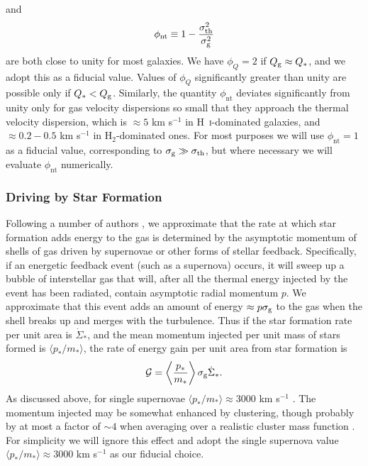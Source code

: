 \documentclass[useAMS,usenatbib]{mn2e}
\newcommand{\calG}{\mathcal{G}}
\newcommand{\phint}{\phi_{\mathrm{nt}}}
\begin{document}
and
\begin{equation}
\label{eq:phith}
\phi_{\rm nt} \equiv 1 - \frac{\sigma_{\rm th}^2}{\sigma_{\rm g}^2}
\end{equation}
are both close to unity for most galaxies. We have $\phi_Q = 2$ if $Q_{\rm g} \approx Q_*$, and we adopt this as a fiducial value. Values of $\phi_Q$ significantly greater than unity are possible only if $Q_* < Q_{\rm g}$. Similarly, the quantity $\phint$ deviates significantly from unity only for gas velocity dispersions so small that they approach the thermal velocity dispersion, which is $\approx 5$ km s$^{-1}$ in H~\textsc{i}-dominated galaxies, and $\approx 0.2 - 0.5$ km s$^{-1}$ in H$_2$-dominated ones. For most purposes we will use $\phint = 1$ as a fiducial value, corresponding to $\sigma_{\rm g} \gg \sigma_{\rm th}$, but where necessary we will evaluate $\phint$ numerically.


\subsubsection{Driving by Star Formation}
\label{sssec:driving}

Following a number of authors \citep{matzner02a, krumholz06d, krumholz17a, goldbaum11a, faucher-giguere13a}, we approximate that the rate at which star formation adds energy to the gas is determined by the asymptotic momentum of shells of gas driven by supernovae or other forms of stellar feedback. Specifically, if an energetic feedback event (such as a supernova) occurs, it will sweep up a bubble of interstellar gas that will, after all the thermal energy injected by the event has been radiated, contain  asymptotic radial momentum $p$. We approximate that this event adds an amount of energy $\approx p \sigma_{\rm g}$ to the gas when the shell breaks up and merges with the turbulence. Thus if the star formation rate per unit area is $\dot{\Sigma}_*$, and the mean momentum injected per unit mass of stars formed is $\langle p_*/m_*\rangle$, the rate of energy gain per unit area from star formation is
\begin{equation}
\calG = \left\langle\frac{p_*}{m_*}\right\rangle \sigma_{\rm g} \dot{\Sigma}_*.
\end{equation}
As discussed above, for single supernovae $\langle p_*/m_*\rangle \approx 3000$ km s$^{-1}$ \citep{cioffi88a, thornton98a, martizzi15a, kim15a, walch15b}. The momentum injected may be somewhat enhanced by clustering, though probably by at most a factor of $\sim 4$ when averaging over a realistic cluster mass function \citep{sharma14a, gentry17a, gentry18a, kim17a}. For simplicity we will ignore this effect and adopt the single supernova value $\langle p_*/m_*\rangle \approx 3000$ km s$^{-1}$ as our fiducial choice.
\end{document}
